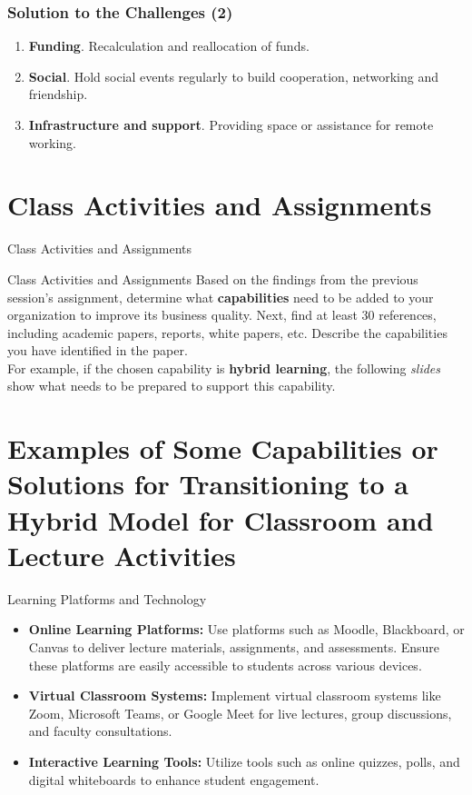 \documentclass[aspectratio=169, table]{beamer}
\begin{document}
    \begin{frame}
        \frametitle{Solution to the Challenges (2)}
        \begin{enumerate}
            \item \textbf{Funding}. Recalculation and reallocation of funds.
            \item \textbf{Social}. Hold social events regularly to build cooperation, networking and friendship.
            \item \textbf{Infrastructure and support}. Providing space or assistance for remote working.
        \end{enumerate}
    \end{frame}


\section{Class Activities and Assignments}
\begin{frame}
	\centering
	\Huge Class Activities and Assignments
\end{frame}

\begin{frame}{Class Activities and Assignments}
	Based on the findings from the previous session's assignment, determine what \textbf{capabilities} need to be added to your organization to improve its business quality. Next, find at least 30 references, including academic papers, reports, white papers, etc. Describe the capabilities you have identified in the paper.\\ 
	\vspace{10pt}
	For example, if the chosen capability is \textbf{hybrid learning}, the following \textit{slides} show what needs to be prepared to support this capability.
\end{frame}


\section{Examples of Some Capabilities or Solutions for Transitioning to a Hybrid Model for Classroom and Lecture Activities}

\begin{frame}{Learning Platforms and Technology}
	\begin{itemize}
		\item \textbf{Online Learning Platforms:} Use platforms such as Moodle, Blackboard, or Canvas to deliver lecture materials, assignments, and assessments. Ensure these platforms are easily accessible to students across various devices.
		\item \textbf{Virtual Classroom Systems:} Implement virtual classroom systems like Zoom, Microsoft Teams, or Google Meet for live lectures, group discussions, and faculty consultations.
		\item \textbf{Interactive Learning Tools:} Utilize tools such as online quizzes, polls, and digital whiteboards to enhance student engagement.
	\end{itemize}
\end{frame}
\end{document}
